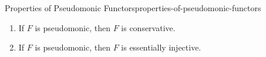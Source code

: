 \begin{proposition}{Properties of Pseudomonic Functors}{properties-of-pseudomonic-functors}
\begin{enumerate}
\begin{enumerate}
{                        \[
                            F^{*}%
                            \colon%
                            \Fun(\CatFont{D},\CatFont{X})%
                            \to%
                            \Fun(\CatFont{C},\CatFont{X})%
                        \]%
                        to be pseudomonic leads to pseudoepic functors; see \cref{properties-of-pseudoepic-functors-characterisations-b} of \cref{properties-of-pseudoepic-functors-characterisations} of \cref{properties-of-pseudoepic-functors}.
                        \par\vspace*{\TCBBoxCorrection}
                    } %
                    functor
                    \[
                        F_{*}%
                        \colon%
                        \Fun(\CatFont{X},\CatFont{C})%
                        \to%
                        \Fun(\CatFont{X},\CatFont{D})%
                    \]%
                    is pseudomonic.
            \end{enumerate}
        \item\label{properties-of-pseudomonic-functors-conservativity}If $F$ is pseudomonic, then $F$ is conservative.
        \item\label{properties-of-pseudomonic-functors-essential-injectivity}If $F$ is pseudomonic, then $F$ is essentially injective.
    \end{enumerate}
\end{proposition}
